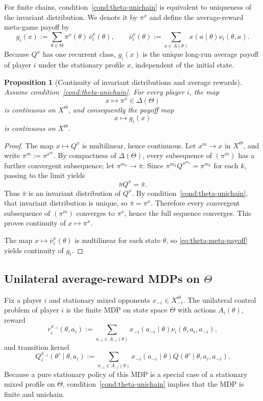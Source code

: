 \documentclass[11pt]{article}
\newtheorem{proposition}[theorem]{Proposition}
\theoremstyle{definition}
\newcommand{\1}{\mathbf{1}}
\begin{document}
For finite chains, condition~\ref{cond:theta-unichain} is equivalent to uniqueness of the invariant distribution. We denote it by $\pi^x$ and define the average-reward meta-game payoff by
\begin{equation}\label{eq:theta-meta-payoff}
g_i(x):=\sum_{\theta\in\Theta}\pi^x(\theta)\,\bar\nu_i^x(\theta),
\qquad
\bar\nu_i^x(\theta):=\sum_{a\in A(\theta)}x(a\mid \theta)\nu_i(\theta,a).
\end{equation}
Because $Q^x$ has one recurrent class, $g_i(x)$ is the unique long-run average payoff of player $i$ under the stationary profile $x$, independent of the initial state.

\begin{proposition}[Continuity of invariant distributions and average rewards]\label{prop:theta-continuity}
Assume condition~\ref{cond:theta-unichain}. For every player $i$, the map
\[
x\longmapsto \pi^x\in\Delta(\Theta)
\]
is continuous on $X^\Theta$, and consequently the payoff map
\[
x\longmapsto g_i(x)
\]
is continuous on $X^\Theta$.
\end{proposition}

\begin{proof}
The map $x\mapsto Q^x$ is multilinear, hence continuous. Let $x^m\to x$ in $X^\Theta$, and write $\pi^m:=\pi^{x^m}$. By compactness of $\Delta(\Theta)$, every subsequence of $(\pi^m)$ has a further convergent subsequence; let $\pi^{m_k}\to\bar\pi$. Since $\pi^{m_k}Q^{x^{m_k}}=\pi^{m_k}$ for each $k$, passing to the limit yields
\[
\bar\pi Q^x=\bar\pi.
\]
Thus $\bar\pi$ is an invariant distribution of $Q^x$. By condition~\ref{cond:theta-unichain}, that invariant distribution is unique, so $\bar\pi=\pi^x$. Therefore every convergent subsequence of $(\pi^m)$ converges to $\pi^x$, hence the full sequence converges. This proves continuity of $x\mapsto\pi^x$.

The map $x\mapsto\bar\nu_i^x(\theta)$ is multilinear for each state $\theta$, so \eqref{eq:theta-meta-payoff} yields continuity of $g_i$.
\end{proof}

\subsection{Unilateral average-reward MDPs on $\Theta$}

Fix a player $i$ and stationary mixed opponents $x_{-i}\in X_{-i}^\Theta$. The unilateral control problem of player $i$ is the finite MDP on state space $\Theta$ with actions $A_i(\theta)$, reward
\[
r_i^{x_{-i}}(\theta,a_i)
:=\sum_{a_{-i}\in A_{-i}(\theta)}x_{-i}(a_{-i}\mid \theta)\nu_i(\theta,a_i,a_{-i}),
\]
and transition kernel
\[
Q_i^{x_{-i}}(\theta'\mid \theta,a_i)
:=\sum_{a_{-i}\in A_{-i}(\theta)}x_{-i}(a_{-i}\mid \theta)Q(\theta'\mid \theta,a_i,a_{-i}).
\]
Because a pure stationary policy of this MDP is a special case of a stationary mixed profile on $\Theta$, condition~\ref{cond:theta-unichain} implies that the MDP is finite and unichain.
\end{document}

